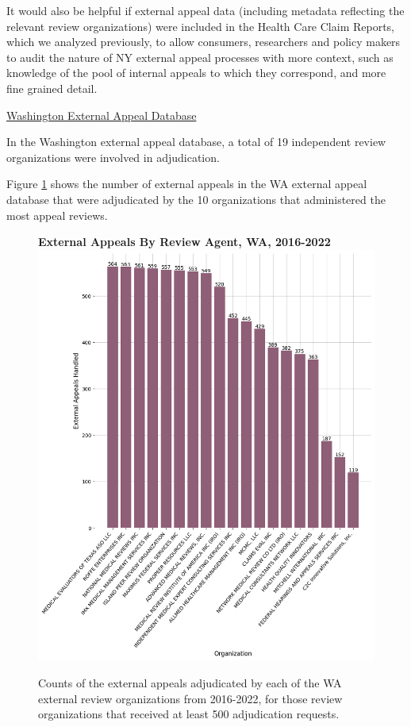 \documentclass[12pt, a4paper,twoside]{report}
\theoremstyle{plain} %
\theoremstyle{definition} %
\theoremstyle{remark} %
\numberwithin{equation}{chapter}
\begin{document}
		It would also be helpful if external appeal data (including metadata reflecting the relevant review organizations) were included in the Health Care Claim Reports, which we analyzed previously, to allow consumers, researchers and policy makers to audit the nature of NY external appeal processes with more context, such as knowledge of the pool of internal appeals to which they correspond, and more fine grained detail.
		
		\underline{Washington External Appeal Database}
		
		In the Washington external appeal database, a total of 19 independent review organizations were involved in adjudication.
		
		Figure \ref{waexternalappealsbyreviewagent} shows the number of external appeals in the WA external appeal database that were adjudicated by the 10 organizations that administered the most appeal reviews.
		
		
		\begin{figure}[h!]
			\centering
			\textbf{External Appeals By Review Agent, WA, 2016-2022}
			\includegraphics[width=.8\textwidth]{images/wa_external_appeals/external_appeals_by_agent.png}
			\caption{Counts of the external appeals adjudicated by each of the WA external review organizations from 2016-2022, for those review organizations that received at least 500 adjudication requests.}
			\label{waexternalappealsbyreviewagent}
		\end{figure}
	
\end{document}
